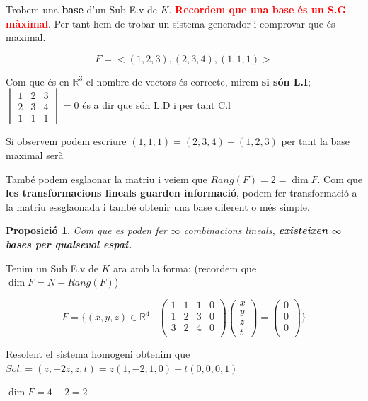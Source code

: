 \documentclass[12pt]{article}
\newtheorem{proposicio}{Proposició}[section]
\newcommand{\R}{\mathbb{R}}
\begin{document}
\begin{examplebox}{}
    Trobem una \textbf{base} d'un Sub E.v de $K$. \textcolor{red}{\textbf{Recordem que una base és un S.G màximal}}. Per tant hem de trobar un sistema generador i comprovar que és maximal.

    \[F = <(1,2,3), (2,3,4), (1,1,1)>\]
    
    Com que és en $\R^3$ el nombre de vectors és correcte, mirem \textbf{si són L.I}; $\begin{vmatrix}
        1 & 2 & 3 \\
        2 & 3 & 4 \\
        1 & 1 & 1
    \end{vmatrix} = 0$ és a dir que són L.D i per tant C.l
    
    Si observem podem escriure $(1,1,1) = (2,3,4)-(1,2,3)$ per tant la base maximal serà

    També podem esglaonar la matriu i veiem que $Rang(F) = 2 = \dim F$. Com que \textbf{les transformacions lineals guarden informació}, podem fer transformació a la matriu essglaonada i també obtenir una base diferent o més simple.

    \begin{proposicio}
        Com que es poden fer $\infty$ combinacions lineals, \textbf{existeixen $\infty$ bases per qualsevol espai.}
    \end{proposicio}
\end{examplebox}

\begin{examplebox}{}
    Tenim un Sub E.v de $K$ ara amb la forma; (recordem que $\boxed{\dim F = N - Rang(F)}$)

    \[F = \{(x,y,z) \in \R^4 \mid \begin{pmatrix}
    1 & 1 & 1 & 0 \\
    1 & 2 & 3 & 0 \\
    3 & 2 & 4 & 0 \\
    \end{pmatrix} \begin{pmatrix}
    x\\
    y\\
    z\\
    t
    \end{pmatrix}= \begin{pmatrix}
        0\\
        0\\
        0\\
    \end{pmatrix}\}\]

    Resolent el sistema homogeni obtenim que $Sol. = (z, -2z, z, t) = z(1,-2,1,0) + t(0,0,0,1)$

    $\dim F = 4 - 2 = 2$
\end{examplebox}
\end{document}
